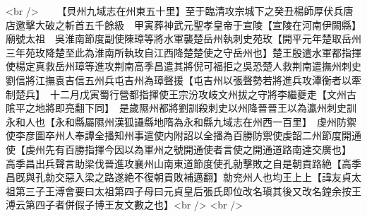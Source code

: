 <br />
　　【貝州九域志在州東五十里】至于臨清攻宗城下之癸丑楊師厚伏兵唐店邀擊大破之斬首五千餘級　甲寅葬神武元聖孝皇帝于宣陵【宣陵在河南伊闕縣】廟號太祖　吳淮南節度副使陳璋等將水軍襲楚岳州執刺史苑玫【開平元年楚取岳州三年苑玫降楚至此為淮南所執玫自江西降楚楚使之守岳州也】楚王殷遣水軍都指揮使楊定真救岳州璋等進攻荆南高季昌遣其將倪可福拒之吳恐楚人救荆南遣撫州刺史劉信將江撫袁吉信五州兵屯吉州為璋聲援【屯吉州以張聲勢若將進兵攻潭衡者以牽制楚兵】　十二月戊寅蜀行營都指揮使王宗汾攻岐文州拔之守將李繼夔走【文州古隂平之地將即亮翻下同】　是歲隰州都將劉訓殺刺史以州降晉晉王以為瀛州刺史訓永和人也【永和縣屬隰州漢狐讘縣地隋為永和縣九域志在州西一百里】　虔州防禦使李彦圖卒州人奉譚全播知州事遣使内附詔以全播為百勝防禦使虔韶二州節度開通使【虔州先有百勝指揮今因以為軍州之號開通使者言使之開通道路南達交廣也】　高季昌出兵聲言助梁伐晉進攻襄州山南東道節度使孔勍擊敗之自是朝貢路絶【高季昌旣與孔勍交惡入梁之路遂絶不復朝貢敗補邁翻】勍兖州人也均王上上【諱友貞太祖第三子王溥會要曰太祖第四子母曰元貞皇后張氏即位改名瑱其後又改名鍠余按王溥云第四子者併假子博王友文數之也】<br />
<br />
